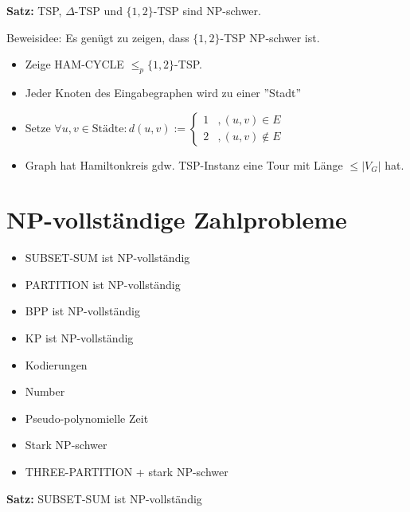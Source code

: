\documentclass[a4paper,graphics,11pt]{article}
\begin{document}
\newpage

\textbf{Satz:} TSP, $\Delta$-TSP und $\{1,2\}$-TSP sind \textsf{NP}-schwer.

Beweisidee: Es genügt zu zeigen, dass $\{1,2\}$-TSP \textsf{NP}-schwer ist. 
\begin{itemize}
    \item Zeige HAM-CYCLE $\leq_p \{1,2\}$-TSP.
    \item Jeder Knoten des Eingabegraphen wird zu einer ''Stadt''
    \item Setze $\forall u,v \in \text{Städte}: d(u,v) := \begin{cases}1 &, (u,v) \in E\\ 2 &, (u,v) \notin E\end{cases}$
    \item Graph hat Hamiltonkreis gdw. TSP-Instanz eine Tour mit Länge $\leq |V_G|$ hat.
\end{itemize}

\newpage

\section{\textsf{NP}-vollständige Zahlprobleme}


\begin{itemize}
    \item SUBSET-SUM ist \textsf{NP}-vollständig
    \item PARTITION ist \textsf{NP}-vollständig
    \item BPP ist \textsf{NP}-vollständig
    \item KP ist \textsf{NP}-vollständig
    \item Kodierungen
    \item Number
    \item Pseudo-polynomielle Zeit
    \item Stark \textsf{NP}-schwer
    \item THREE-PARTITION + stark \textsf{NP}-schwer
\end{itemize}

\textbf{Satz:} SUBSET-SUM ist \textsf{NP}-vollständig
\end{document}
